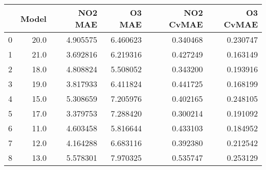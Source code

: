 \begin{tabular}{lrrrrr}
\toprule
{} &  Model &   NO2 MAE &    O3 MAE &  NO2 CvMAE &  O3 CvMAE \\
\midrule
0 &   20.0 &  4.905575 &  6.460623 &   0.340468 &  0.230747 \\
1 &   21.0 &  3.692816 &  6.219316 &   0.427249 &  0.163149 \\
2 &   18.0 &  4.808824 &  5.508052 &   0.343200 &  0.193916 \\
3 &   19.0 &  3.817933 &  6.411824 &   0.441725 &  0.168199 \\
4 &   15.0 &  5.308659 &  7.205976 &   0.402165 &  0.248105 \\
5 &   17.0 &  3.379753 &  7.288420 &   0.300214 &  0.191092 \\
6 &   11.0 &  4.603458 &  5.816644 &   0.433103 &  0.184952 \\
7 &   12.0 &  4.164288 &  6.683116 &   0.392380 &  0.212542 \\
8 &   13.0 &  5.578301 &  7.970325 &   0.535747 &  0.253129 \\
\bottomrule
\end{tabular}
